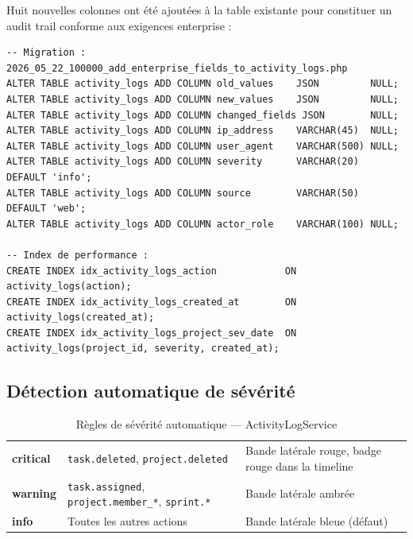 Huit nouvelles colonnes ont été ajoutées à la table existante pour constituer
un audit trail conforme aux exigences enterprise :

\begin{lstlisting}[style=sqlstyle,caption={Colonnes ajoutées — migration Sprint 6},
  label={lst:migration_s6}]
-- Migration : 2026_05_22_100000_add_enterprise_fields_to_activity_logs.php
ALTER TABLE activity_logs ADD COLUMN old_values    JSON         NULL;
ALTER TABLE activity_logs ADD COLUMN new_values    JSON         NULL;
ALTER TABLE activity_logs ADD COLUMN changed_fields JSON        NULL;
ALTER TABLE activity_logs ADD COLUMN ip_address    VARCHAR(45)  NULL;
ALTER TABLE activity_logs ADD COLUMN user_agent    VARCHAR(500) NULL;
ALTER TABLE activity_logs ADD COLUMN severity      VARCHAR(20)  DEFAULT 'info';
ALTER TABLE activity_logs ADD COLUMN source        VARCHAR(50)  DEFAULT 'web';
ALTER TABLE activity_logs ADD COLUMN actor_role    VARCHAR(100) NULL;

-- Index de performance :
CREATE INDEX idx_activity_logs_action            ON activity_logs(action);
CREATE INDEX idx_activity_logs_created_at        ON activity_logs(created_at);
CREATE INDEX idx_activity_logs_project_sev_date  ON activity_logs(project_id, severity, created_at);
\end{lstlisting}

\subsection{Détection automatique de sévérité}

\begin{table}[H]
  \centering
  \caption{Règles de sévérité automatique — ActivityLogService}
  \label{tab:severity_rules}
  \begin{tabularx}{\textwidth}{L{2.5cm}L{4cm}X}
    \toprule
     &  &  \\
    \midrule
    \textbf{critical} & \texttt{task.deleted}, \texttt{project.deleted} &
      Bande latérale rouge, badge rouge dans la timeline \\
    \textbf{warning}  & \texttt{task.assigned}, \texttt{project.member\_*},
      \texttt{sprint.*} & Bande latérale ambrée \\
    \textbf{info}     & Toutes les autres actions &
      Bande latérale bleue (défaut) \\
    \bottomrule
  \end{tabularx}
\end{table}

